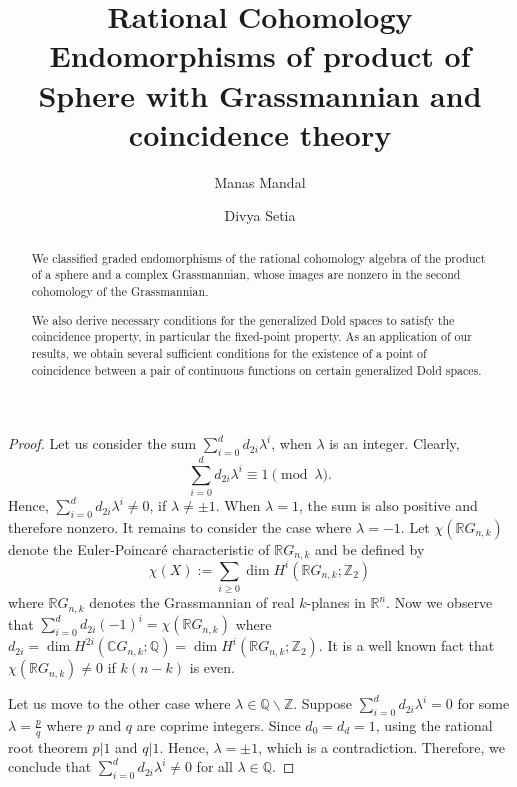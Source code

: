 \documentclass{amsart}
\title[Graded Endomorphisms of $H^*(\mathbb{S}^m \times \mathbb{C}G_{n,k};\mathbb Q)$]{Rational Cohomology Endomorphisms of product of Sphere with Grassmannian and coincidence theory}
\author[M. Mandal]{Manas Mandal}
\author[D. Setia]{Divya Setia}
\begin{document}
\begin{abstract}
We classified graded endomorphisms of the rational cohomology algebra of the product of a sphere and a complex Grassmannian, whose images are nonzero  in the second cohomology of the Grassmannian.

We also derive necessary conditions for the generalized Dold spaces to satisfy the coincidence property, in particular the fixed-point property. As an application of our results, we obtain several sufficient conditions for the existence of a point of coincidence between a pair of continuous functions on certain generalized Dold spaces. 
\end{abstract}
	
\maketitle

	\begin{proof}
		Let us consider the sum $\sum_{i=0}^d d_{2i}\lambda^i$, when $\lambda$ is an integer. 
		Clearly, $$\sum_{i=0}^d d_{2i}\lambda^i \equiv 1 \pmod{\lambda}.$$ %
		Hence, $\sum_{i=0}^d d_{2i}\lambda^i \neq 0$, if $\lambda \neq \pm 1$. When $\lambda = 1$, the sum is also positive and therefore nonzero. It remains to consider the case where $\lambda = -1$.
		Let $\chi(\mathbb{R}G_{n,k})$ denote the Euler-Poincar{\'e} characteristic of $\mathbb{R}G_{n,k}$ and be defined by $$\chi(X):=\sum_{i\ge0}\dim H^i(\mathbb{R}G_{n,k};\mathbb{Z}_2)$$ where $\mathbb{R}G_{n,k}$ denotes the Grassmannian of real $k$-planes in $\mathbb{R}^n$.
		Now we observe that 
		$\sum_{i=0}^d d_{2i}(-1)^i = \chi(\mathbb{R}G_{n,k})$ where $d_{2i} = \operatorname{dim} H^{2i}(\mathbb{C}G_{n,k}; \mathbb{Q}) = \dim H^{i}(\mathbb{R}G_{n,k}; \mathbb{Z}_2)$. 
		It is a well known fact that $\chi(\mathbb{R}G_{n,k}) \neq 0$ if $k(n-k)$ is even. 
		
		Let us move to the other case where $\lambda\in \mathbb{Q}\backslash \mathbb{Z}$. Suppose $\sum_{i=0}^{d} d_{2i}\lambda^i =0$ for some $\lambda = \frac{p}{q}$ where $p$ and $q$ are coprime integers. Since $d_0 =d_d =1$, using the rational root theorem $p|1$ and $q|1$. Hence, $\lambda = \pm 1$, which is a contradiction. Therefore, we conclude that $\sum_{i=0}^{d} d_{2i}\lambda^i \neq 0$ for all $\lambda\in \mathbb Q$. 
	\end{proof}
\end{document}
